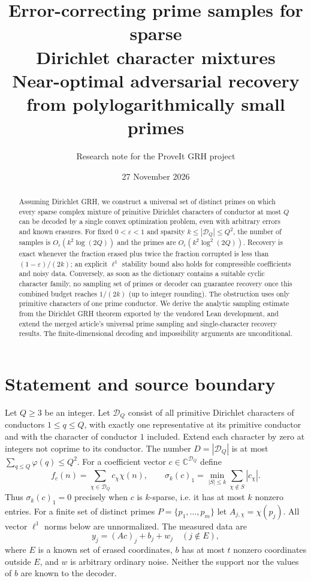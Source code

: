 \documentclass[11pt]{article}
\title{\textbf{Error-correcting prime samples for sparse\\Dirichlet character mixtures}\\[4pt]\large Near-optimal adversarial recovery from polylogarithmically small primes}
\author{Research note for the ProveIt GRH project}
\date{27 November 2026}
\theoremstyle{remark}\newtheorem{remark}[theorem]{Remark}
\newcommand{\C}{\mathbb C}
\newcommand{\D}{\mathcal D}
\newcommand{\abs}[1]{\left|#1\right|}
\newcommand{\eps}{\varepsilon}
\begin{document}
\maketitle
\begin{abstract}
Assuming Dirichlet GRH, we construct a universal set of distinct primes on which every sparse complex mixture of primitive Dirichlet characters of conductor at most $Q$ can be decoded by a single convex optimization problem, even with arbitrary errors and known erasures. For fixed $0<\eps<1$ and sparsity $k\le\abs{\D_Q}\le Q^2$, the number of samples is $O_\eps(k^2\log(2Q))$ and the primes are $O_\eps(k^2\log^2(2Q))$. Recovery is exact whenever the fraction erased plus twice the fraction corrupted is less than $(1-\eps)/(2k)$; an explicit $\ell^1$ stability bound also holds for compressible coefficients and noisy data. Conversely, as soon as the dictionary contains a suitable cyclic character family, no sampling set of primes or decoder can guarantee recovery once this combined budget reaches $1/(2k)$ (up to integer rounding). The obstruction uses only primitive characters of one prime conductor. We derive the analytic sampling estimate from the Dirichlet GRH theorem exported by the vendored Lean development, and extend the merged article's universal prime sampling and single-character recovery results. The finite-dimensional decoding and impossibility arguments are unconditional.
\end{abstract}

\section{Statement and source boundary}
Let $Q\ge3$ be an integer. Let $\D_Q$ consist of all primitive Dirichlet characters of conductors $1\le q\le Q$, with exactly one representative at its primitive conductor and with the character of conductor $1$ included. Extend each character by zero at integers not coprime to its conductor. The number $D=\abs{\D_Q}$ is at most $\sum_{q\le Q}\varphi(q)\le Q^2$. For a coefficient vector $c\in\C^{\D_Q}$ define
\[
 f_c(n)=\sum_{\chi\in\D_Q} c_\chi\chi(n),\qquad
 \sigma_k(c)_1=\min_{\abs{S}\le k}\sum_{\chi\notin S}\abs{c_\chi}.
\]
Thus $\sigma_k(c)_1=0$ precisely when $c$ is $k$-sparse, i.e. it has at most $k$ nonzero entries. For a finite set of distinct primes $P=\{p_1,\dots,p_m\}$ let $A_{j,\chi}=\chi(p_j)$. All vector $\ell^1$ norms below are unnormalized. The measured data are
\[
 y_j=(Ac)_j+b_j+w_j\quad(j\notin E),
\]
where $E$ is a known set of erased coordinates, $b$ has at most $t$ nonzero coordinates outside $E$, and $w$ is arbitrary ordinary noise. Neither the support nor the values of $b$ are known to the decoder.
\end{document}
